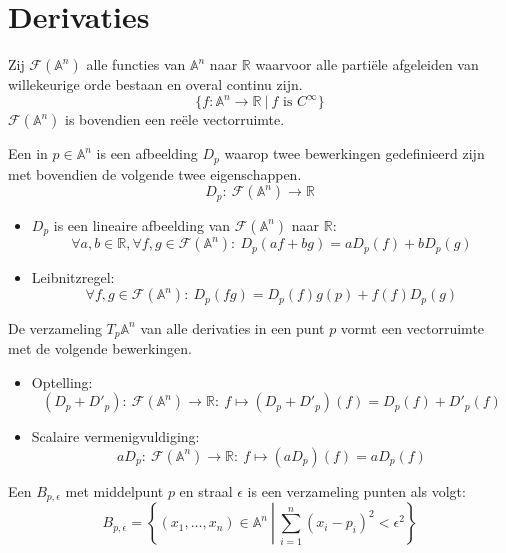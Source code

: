\documentclass[main.tex]{subfiles}
\begin{document}
\chapter{Derivaties}
\label{cha:derivaties}


\begin{de}
  Zij $\mathcal{F}(\mathbb{A}^{n})$ alle functies van $\mathbb{A}^{n}$ naar $\mathbb{R}$ waarvoor alle parti\"ele afgeleiden van willekeurige orde bestaan en overal continu zijn.
  \[ \{ f: \mathbb{A}^{n} \rightarrow \mathbb{R} \ |\ f \text{ is } C^{\infty} \} \]
  $\mathcal{F}(\mathbb{A}^{n})$ is bovendien een re\"ele vectorruimte.
\end{de}

\begin{de}
  Een  in $p\in\mathbb{A}^{n}$ is een afbeelding $D_{p}$ waarop twee bewerkingen gedefinieerd zijn met bovendien de volgende twee eigenschappen.
  \[ D_{p}:\ \mathcal{F}(\mathbb{A}^{n}) \rightarrow \mathbb{R} \]
  \begin{itemize}
  \item $D_{p}$ is een lineaire afbeelding van $\mathcal{F}(\mathbb{A}^{n})$ naar $\mathbb{R}$:
    \[ \forall a,b \in \mathbb{R}, \forall f,g \in \mathcal{F}(\mathbb{A}^{n}):\ D_{p}(af + bg) = aD_{p}(f) + bD_{p}(g) \]
  \item Leibnitzregel: 
    \[ \forall f,g \in \mathcal{F}(\mathbb{A}^{n}):\ D_{p}(fg) = D_{p}(f)g(p) + f(f)D_{p}(g)\]
  \end{itemize}
\end{de}

\begin{ei}
  De verzameling $T_{p}\mathbb{A}^{n}$ van alle derivaties in een punt $p$ vormt een vectorruimte met de volgende bewerkingen.
  \begin{itemize}
  \item Optelling:
    \[ (D_{p} + D'_{p}):\ \mathcal{F}(\mathbb{A}^{n}) \rightarrow \mathbb{R}:\ f \mapsto (D_{p} + D'_{p})(f) = D_{p}(f) + D'_{p}(f)\]
  \item Scalaire vermenigvuldiging:
    \[ aD_{p}:\ \mathcal{F}(\mathbb{A}^{n}) \rightarrow \mathbb{R}:\ f \mapsto (aD_{p})(f) = aD_{p}(f)\]
  \end{itemize}
\end{ei}

\begin{de}
  Een  $B_{p,\epsilon}$ met middelpunt $p$ en straal $\epsilon$ is een verzameling punten als volgt:
  \[ B_{p,\epsilon} = \left\{ (x_{1},\dotsc ,x_{n})\in \mathbb{A}^{n}\ \left|\ \sum_{i=1}^{n}(x_{i}-p_{i})^{2} < \epsilon^{2} \right.\right\}\]
\end{de}
\end{document}
